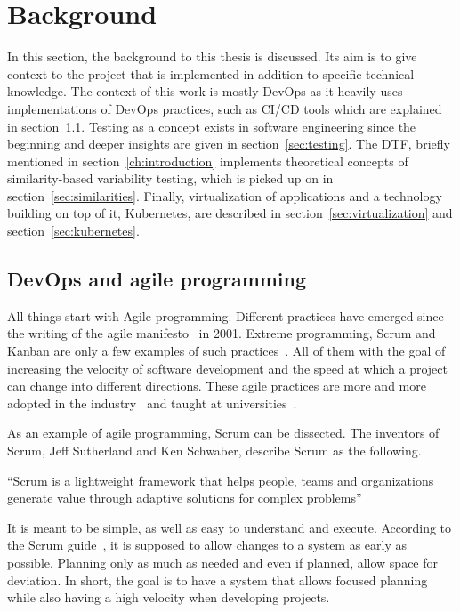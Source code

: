 \chapter{Background}\label{ch:background}

In this section, the background to this thesis is discussed.
Its aim is to give context to the project that is implemented in addition to specific technical knowledge.
The context of this work is mostly DevOps as it heavily uses implementations of DevOps practices, such as CI/CD tools which are explained in section~\ref{sec:devops-and-agile-programming}.
Testing as a concept exists in software engineering since the beginning and deeper insights are given in section~\ref{sec:testing}.
The DTF, briefly mentioned in section~\ref{ch:introduction} implements theoretical concepts of similarity-based variability testing, which is picked up on in section~\ref{sec:similarities}.
Finally, virtualization of applications and a technology building on top of it, Kubernetes, are described in section~\ref{sec:virtualization} and section~\ref{sec:kubernetes}.

\section{DevOps and agile programming}\label{sec:devops-and-agile-programming}

All things start with Agile programming.
Different practices have emerged since the writing of the agile manifesto~\cite{AgileManifesto} in 2001.
Extreme programming, Scrum and Kanban are only a few examples of such practices~\cite{ADecadeOfAgileMethodologies}.
All of them with the goal of increasing the velocity of software development and the speed at which a project can change into different directions.
These agile practices are more and more adopted in the industry~\cite{BecomingAgileTogether} and taught at universities~\cite{StudienhandbuchProjectManagement}.

As an example of agile programming, Scrum can be dissected.
The inventors of Scrum, Jeff Sutherland and Ken Schwaber, describe Scrum as the following.

``Scrum is a lightweight framework that helps people, teams and organizations generate value through
adaptive solutions for complex problems''~\cite{the-scrum-guide}

\pagebreak

It is meant to be simple, as well as easy to understand and execute.
According to the Scrum guide~\cite{the-scrum-guide}, it is supposed to allow changes to a system as early as possible.
Planning only as much as needed and even if planned, allow space for deviation.
In short, the goal is to have a system that allows focused planning while also having a high velocity when developing projects.

